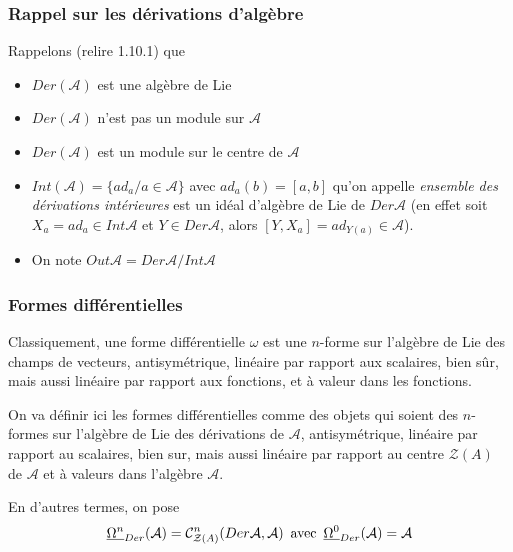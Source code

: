 \subsubsection{Rappel sur les d\'erivations d'alg\`ebre}


 Rappelons  (relire 1.10.1)  que
 
 \begin{itemize}
 	\item $Der({\mathcal A})$ est une alg\`ebre de Lie  
 
 	\item  $Der({\mathcal A})$ n'est pas un module sur ${\mathcal A}$
 
 	\item  $Der({\mathcal A})$ est un module sur le centre de ${\mathcal A}$
 
 	\item  
$Int({\mathcal A}) = \{ad_{a} / a\in {\mathcal A} \}$ avec 
$ad_{a}(b) = [a,b]$ qu'on appelle {\sl ensemble des d\'erivations 
int\'erieures\/} est un id\'eal d'alg\`ebre de Lie de $Der {\mathcal 
A}$ (en effet soit $X_{a}  =  ad_{a} \in Int {\mathcal A}$ et $Y 
\in Der {\mathcal A}$, alors $[Y,X_{a}] = ad_{Y(a)} \in {\mathcal A}$).
 
 	\item  On note $Out {\mathcal A} = Der {\mathcal A} / Int {\mathcal A}$
 \end{itemize}
 
\subsubsection{Formes diff\'erentielles}

Classiquement, une forme diff\'erentielle $\omega$ est une $n$-forme 
sur l'alg\`ebre de Lie des champs de vecteurs, antisym\'etrique, lin\'eaire par rapport aux 
scalaires, bien s\^ur, mais aussi lin\'eaire par rapport aux fonctions, 
et \`a valeur dans les fonctions.

On va d\'efinir ici les formes diff\'erentielles comme des objets qui 
soient des $n$-formes
sur l'alg\`ebre de Lie des d\'erivations de ${\mathcal A}$, antisym\'etrique, lin\'eaire par rapport au 
scalaires, bien sur, mais aussi lin\'eaire par rapport au centre ${\mathcal 
Z(A)}$  de ${\mathcal A}$ et \`a valeurs dans l'alg\`ebre ${\mathcal A}$.

En d'autres termes, on pose
$${\underline{{\Omega}^{n}}_{Der}}({\mathcal A}) = {\mathcal C}^n_{{\mathcal Z(A)}}(Der {\mathcal 
A}, {\mathcal A}) \,   \hbox{  avec  } \,  \underline{{\Omega}^0}_{Der}({\mathcal A}) = {\mathcal A}$$

